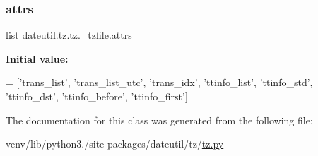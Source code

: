 \subsubsection{\texorpdfstring{attrs}{attrs}}
{\footnotesize\ttfamily list dateutil.\+tz.\+tz.\+\_\+tzfile.\+attrs\hspace{0.3cm}{\ttfamily [static]}}

{\bfseries Initial value\+:}
\begin{DoxyCode}
=  [\textcolor{stringliteral}{'trans\_list'}, \textcolor{stringliteral}{'trans\_list\_utc'}, \textcolor{stringliteral}{'trans\_idx'}, \textcolor{stringliteral}{'ttinfo\_list'},
             \textcolor{stringliteral}{'ttinfo\_std'}, \textcolor{stringliteral}{'ttinfo\_dst'}, \textcolor{stringliteral}{'ttinfo\_before'}, \textcolor{stringliteral}{'ttinfo\_first'}]
\end{DoxyCode}


The documentation for this class was generated from the following file\+:\begin{DoxyCompactItemize}
\item 
venv/lib/python3./site-\/packages/dateutil/tz/\hyperlink{tz_8py}{tz.\+py}\end{DoxyCompactItemize}
